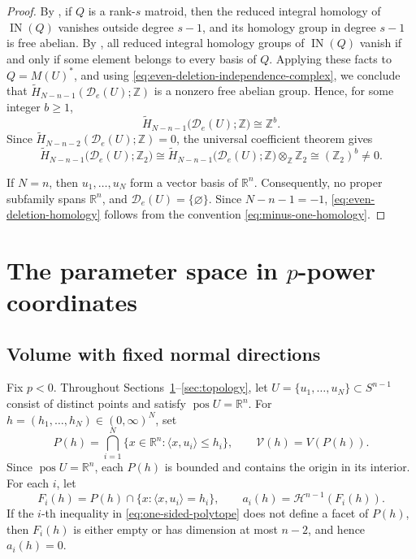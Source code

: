 \documentclass[12pt,reqno]{amsart}
\numberwithin{equation}{section}
\theoremstyle{remark}
\DeclareMathOperator{\pos}{pos}
\newcommand{\R}{\mathbb R}
\newcommand{\Haus}{\mathcal H}
\newcommand{\Dcal}{\mathcal D}
\begin{document}
\begin{proof}
	By \cite[Theorem~7.8.1]{BjornerMatroids}, if \(Q\) is a rank-\(s\)
	matroid, then the reduced integral homology of
	\(\operatorname{IN}(Q)\) vanishes outside degree \(s-1\), and its
	homology group in degree \(s-1\) is free abelian. By
	\cite[Exercise~7.39(a)]{BjornerMatroids}, all reduced integral
	homology groups of \(\operatorname{IN}(Q)\) vanish if and only if
	some element belongs to every basis of \(Q\). Applying these facts
	to \(Q=M(U)^*\), and using
	\eqref{eq:even-deletion-independence-complex}, we conclude that
	\(\widetilde H_{N-n-1}(\Dcal_e(U);\mathbb Z)\) is a nonzero free
	abelian group. Hence, for some integer \(b\geq1\),
	\[
	\widetilde H_{N-n-1}
	\bigl(\Dcal_e(U);\mathbb Z\bigr)
	\cong \mathbb Z^b.
	\]
	Since
	\(\widetilde H_{N-n-2}(\Dcal_e(U);\mathbb Z)=0\), the universal
	coefficient theorem gives
	\[
	\widetilde H_{N-n-1}
	\bigl(\Dcal_e(U);\mathbb Z_2\bigr)
	\cong
	\widetilde H_{N-n-1}
	\bigl(\Dcal_e(U);\mathbb Z\bigr)
	\otimes_{\mathbb Z}\mathbb Z_2
	\cong
	(\mathbb Z_2)^b\neq0.
	\]
	
	If \(N=n\), then \(u_1,\ldots,u_N\) form a vector basis of \(\R^n\).
	Consequently, no proper subfamily spans \(\R^n\), and
	\(\Dcal_e(U)=\{\varnothing\}\). Since \(N-n-1=-1\),
	\eqref{eq:even-deletion-homology} follows from the convention
	\eqref{eq:minus-one-homology}.
\end{proof}


\section{The parameter space in \texorpdfstring{\(p\)-power}{p-power} coordinates}\label{sec:parameter}

\subsection{Volume with fixed normal directions}
\label{subsec:fixed-normal-volume}
Fix $p<0$. Throughout Sections~\ref{sec:parameter}--\ref{sec:topology}, let $U=\{u_1,\ldots,u_N\}\subset S^{n-1}$ consist of distinct points and satisfy $\pos U=\R^n$. For $h=(h_1,\ldots,h_N)\in(0,\infty)^N$, set
\begin{equation}\label{eq:one-sided-polytope}
 P(h)=\bigcap_{i=1}^N
 \{x\in\R^n:\langle x,u_i\rangle\leq h_i\},
 \qquad
 \mathcal V(h)=V(P(h)).
\end{equation}
Since \(\pos U=\R^n\), each \(P(h)\) is bounded and contains the
origin in its interior. For each $i$, let
\begin{equation}
 F_i(h)=P(h)\cap\{x:\langle x,u_i\rangle=h_i\},
 \qquad
 a_i(h)=\Haus^{n-1}(F_i(h)).
\end{equation}
If the $i$-th inequality in \eqref{eq:one-sided-polytope} does not define a facet of $P(h)$, then
$F_i(h)$ is either empty or has dimension at most $n-2$, and hence
$a_i(h)=0$.
\end{document}
